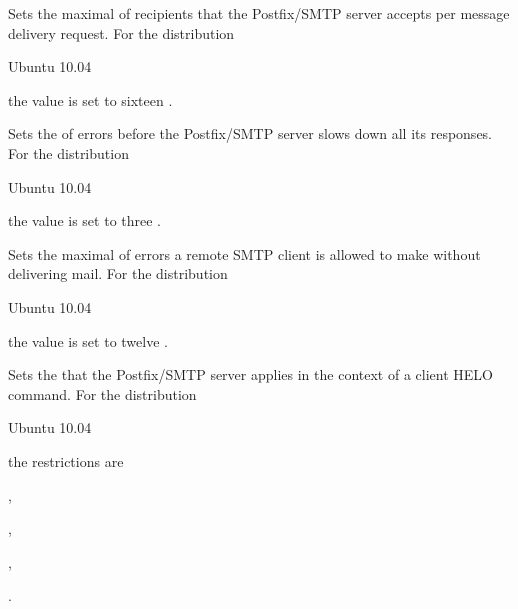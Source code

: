 
Sets the maximal  of recipients that the Postfix/SMTP server
accepts per message delivery request.
For the distribution
\begin{inparaitem}
\item[\TheDistribution{ubuntu}] Ubuntu 10.04
\end{inparaitem}
the value is set to sixteen .


Sets the  of errors before the Postfix/SMTP server slows
down all its responses.
For the distribution
\begin{inparaitem}
\item[\TheDistribution{ubuntu}] Ubuntu 10.04
\end{inparaitem}
the value is set to three .


Sets the maximal  of errors a remote SMTP client is allowed
to make without delivering mail.
For the distribution
\begin{inparaitem}
\item[\TheDistribution{ubuntu}] Ubuntu 10.04
\end{inparaitem}
the value is set to twelve .


Sets the  that the Postfix/SMTP server applies in the
context of a client HELO command.
For the distribution
\begin{inparaitem}
\item[\TheDistribution{ubuntu}] Ubuntu 10.04
\end{inparaitem}
the restrictions are
\begin{compactitem}
\item {},
\item {},
\item {},
\item {}.
\end{compactitem}


